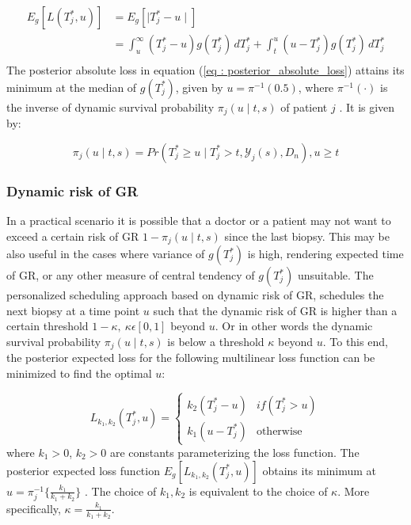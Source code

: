 \begin{equation}
\label{eq : posterior_absolute_loss}
\begin{split}
E_g[L(T^*_j, u)] &= E_g[\mid T^*_j - u \mid]\\
&= \int_u^\infty (T^*_j - u) g(T^*_j)\, dT^*_j + \int_t^u (u - T^*_j) g(T^*_j)\, dT^*_j\\
\end{split}
\end{equation}
The posterior absolute loss in equation (\ref{eq : posterior_absolute_loss}) attains its minimum at the median of $g(T^*_j)$, given by $u = \pi^{-1}(0.5)$, where $\pi^{-1}(\cdot)$ is the inverse of dynamic survival probability $\pi_j(u \mid t, s)$ of patient $j$ \citep{rizopoulos2011dynamic}. It is given by:

\begin{equation}
\pi_j(u \mid t, s) = Pr(T^*_j \geq u \mid  T^*_j >t, \mathcal{Y}_j(s), D_n), u \geq t
\end{equation}

\subsubsection{Dynamic risk of GR}
\label{subsubsec : dynamic_risk_definitions}
In a practical scenario it is possible that a doctor or a patient may not want to exceed a certain risk of GR $1 - \pi_j(u \mid t, s)$ since the last biopsy. This may be also useful in the cases where variance of $g(T^*_j)$ is high, rendering expected time of GR, or any other measure of central tendency of $g(T^*_j)$ unsuitable. The personalized scheduling approach based on dynamic risk of GR, schedules the next biopsy at a time point $u$ such that the dynamic risk of GR is higher than a certain threshold $1-\kappa,\ \kappa \epsilon [0,1]$ beyond $u$. Or in other words the dynamic survival probability $\pi_j(u \mid t, s)$ is below a threshold $\kappa$ beyond $u$. To this end, the posterior expected loss for the following multilinear loss function can be minimized to find the optimal $u$:

\begin{equation}
\label{eq : loss_dynamic_risk}
L_{k_1, k_2}(T^*_j, u) =
    \begin{cases}
      k_2(T^*_j-u) & if(T^*_j > u)\\
      k_1(u-T^*_j) & \text{otherwise}
    \end{cases}       
\end{equation}
where $k_1 > 0$, $k_2 > 0$ are constants parameterizing the loss function. The posterior expected loss function $E_g[L_{k_1, k_2}(T^*_j, u)]$ obtains its minimum at $u = \pi_j^{-1}\Big\{\frac{k_1}{k_1 + k_2}\Big\}$ \citep{robertBayesianChoice}. The choice of $k_1, k_2$ is equivalent to the choice of $\kappa$. More specifically, $\kappa = \frac{k_1}{k_1 + k_2}$.

